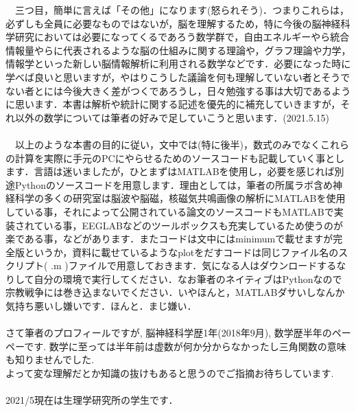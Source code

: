 \documentclass[11pt,a4paper]{ujreport}
\begin{document}
　三つ目，簡単に言えば「その他」になります(怒られそう)．つまりこれらは，必ずしも全員に必要なものではないが，脳を理解するため，特に今後の脳神経科学研究においては必要になってくるであろう数学群で，自由エネルギーやら統合情報量やらに代表されるような脳の仕組みに関する理論や，グラフ理論や力学，情報学といった新しい脳情報解析に利用される数学などです．必要になった時に学べば良いと思いますが，やはりこうした議論を何も理解していない者とそうでない者とには今後大きく差がつくであろうし，日々勉強する事は大切であるように思います．本書は解析や統計に関する記述を優先的に補充していきますが，それ以外の数学については筆者の好みで足していこうと思います．(2021.5.15)\\\\
　以上のような本書の目的に従い，文中では(特に後半)，数式のみでなくこれらの計算を実際に手元のPCにやらせるためのソースコードも記載していく事とします．言語は迷いましたが，ひとまずはMATLABを使用し，必要を感じれば別途Pythonのソースコードを用意します．理由としては，筆者の所属ラボ含め神経科学の多くの研究室は脳波や脳磁，核磁気共鳴画像の解析にMATLABを使用している事，それによって公開されている論文のソースコードもMATLABで実装されている事，EEGLABなどのツールボックスも充実しているため使うのが楽である事，などがあります．またコードは文中にはminimumで載せますが完全版というか，資料に載せているようなplotをだすコードは同じファイル名のスクリプト( .m )ファイルで用意しておきます．気になる人はダウンロードするなりして自分の環境で実行してください．なお筆者のネイティブはPythonなので宗教戦争には巻き込まないでください．いやほんと，MATLABダサいしなんか気持ち悪いし嫌いです．ほんと．まじ嫌い．\\
\\

さて筆者のプロフィールですが, 脳神経科学歴1年(2018年9月), 数学歴半年のペーペーです. 数学に至っては半年前は虚数が何か分からなかったし三角関数の意味も知りませんでした.\\
よって変な理解だとか知識の抜けもあると思うのでご指摘お待ちしています.\\
\\
2021/5現在は生理学研究所の学生です．
\\
\end{document}
